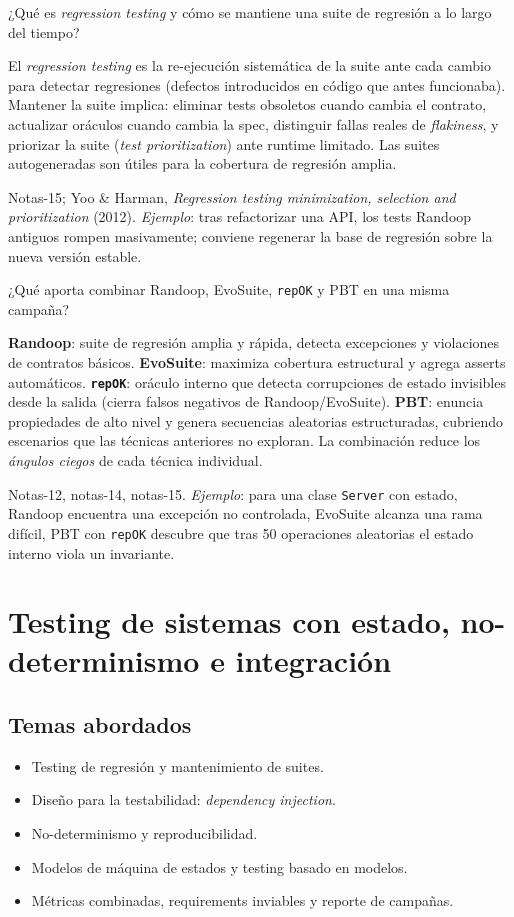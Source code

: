 \documentclass[11pt,a4paper]{article}
\newcounter{preg}
\newcommand{\qa}[3]{%
  \stepcounter{preg}%
  \vspace{0.4em}
  \begin{preguntabox}{\thepreg}
  #1
  \end{preguntabox}
  \begin{respuestabox}
  #2
  \end{respuestabox}
  \begin{refbox}
  #3
  \end{refbox}
  \vspace{0.6em}
}
\begin{document}
\qa{¿Qué es \emph{regression testing} y cómo se mantiene una suite de regresión a lo largo del tiempo?}
{El \emph{regression testing} es la re-ejecución sistemática de la suite ante cada cambio para detectar regresiones (defectos introducidos en código que antes funcionaba). Mantener la suite implica: eliminar tests obsoletos cuando cambia el contrato, actualizar oráculos cuando cambia la spec, distinguir fallas reales de \emph{flakiness}, y priorizar la suite (\emph{test prioritization}) ante runtime limitado. Las suites autogeneradas son útiles para la cobertura de regresión amplia.}
{Notas-15; Yoo \& Harman, \emph{Regression testing minimization, selection and prioritization} (2012). \emph{Ejemplo}: tras refactorizar una API, los tests Randoop antiguos rompen masivamente; conviene regenerar la base de regresión sobre la nueva versión estable.}

\qa{¿Qué aporta combinar Randoop, EvoSuite, \texttt{repOK} y PBT en una misma campaña?}
{\textbf{Randoop}: suite de regresión amplia y rápida, detecta excepciones y violaciones de contratos básicos. \textbf{EvoSuite}: maximiza cobertura estructural y agrega asserts automáticos. \textbf{\texttt{repOK}}: oráculo interno que detecta corrupciones de estado invisibles desde la salida (cierra falsos negativos de Randoop/EvoSuite). \textbf{PBT}: enuncia propiedades de alto nivel y genera secuencias aleatorias estructuradas, cubriendo escenarios que las técnicas anteriores no exploran. La combinación reduce los \emph{ángulos ciegos} de cada técnica individual.}
{Notas-12, notas-14, notas-15. \emph{Ejemplo}: para una clase \texttt{Server} con estado, Randoop encuentra una excepción no controlada, EvoSuite alcanza una rama difícil, PBT con \texttt{repOK} descubre que tras 50 operaciones aleatorias el estado interno viola un invariante.}

\section{Testing de sistemas con estado, no-determinismo e integración}

\subsection*{Temas abordados}
\begin{itemize}[leftmargin=1.4em]
  \item Testing de regresión y mantenimiento de suites.
  \item Diseño para la testabilidad: \emph{dependency injection}.
  \item No-determinismo y reproducibilidad.
  \item Modelos de máquina de estados y testing basado en modelos.
  \item Métricas combinadas, requirements inviables y reporte de campañas.
\end{itemize}
\end{document}
